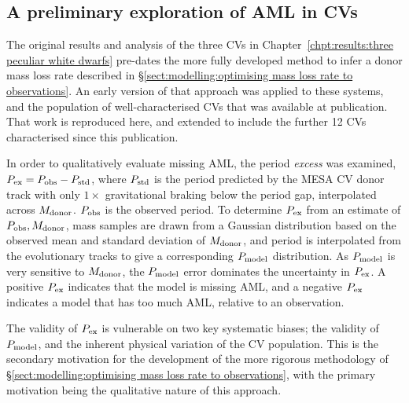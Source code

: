 \newpage
\subsection{A preliminary exploration of AML in CVs}
\label{sect:discussion AML}

The original results and analysis of the three CVs in Chapter~\ref{chpt:results:three peculiar white dwarfs} pre-dates the more fully developed method to infer a donor mass loss rate described in \S\ref{sect:modelling:optimising mass loss rate to observations}. An early version of that approach was applied to these systems, and the population of well-characterised CVs that was available at publication. That work is reproduced here, and extended to include the further 12 CVs characterised since this publication.

In order to qualitatively evaluate missing AML, the period \textit{excess} was examined, $P_{\rm ex} = P_{\rm obs} - P_{\rm std}$, where $P_{\rm std}$ is the period predicted by the MESA CV donor track with only $1\times$ gravitational braking below the period gap, interpolated across $M_{\rm donor}$. $P_{\rm obs}$ is the observed period.
To determine $P_{\rm ex}$ from an estimate of $P_{\rm obs}, M_{\rm donor}$, mass samples are drawn from a Gaussian distribution based on the observed mean and standard deviation of $M_{\rm donor}$, and period is interpolated from the evolutionary tracks to give a corresponding $P_{\rm model}$ distribution. As $P_{\rm model}$ is very sensitive to $M_{\rm donor}$, the $P_{\rm model}$ error dominates the uncertainty in $P_{\rm ex}$.
A positive $P_{\rm ex}$ indicates that the model is missing AML, and a negative $P_{\rm ex}$ indicates a model that has too much AML, relative to an observation.

The validity of $P_{\rm ex}$ is vulnerable on two key systematic biases; the validity of $P_{\rm model}$, and the inherent physical variation of the CV population. This is the secondary motivation for the development of the more rigorous methodology of \S\ref{sect:modelling:optimising mass loss rate to observations}, with the primary motivation being the qualitative nature of this approach.


